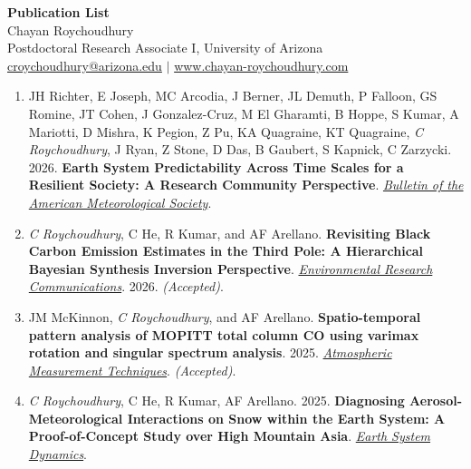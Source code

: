 \documentclass[11pt]{article}
\begin{document}
	
	\begin{center}
		{\Large \textbf{Publication List}} \\[4pt]
		{\large Chayan Roychoudhury} \\[2pt]
		{\small Postdoctoral Research Associate I, University of Arizona} \\
		{\small \href{mailto:croychoudhury@arizona.edu}{croychoudhury@arizona.edu} $\mid$ \href{https://www.chayan-roychoudhury.com/}{www.chayan-roychoudhury.com}}
	\end{center}
	
	\vspace{4mm}
	
	\begin{enumerate}[topsep=2pt, partopsep=1pt, itemsep=4pt, parsep=1pt, leftmargin=18pt, label=\arabic*.]
		
		\item JH Richter, E Joseph, MC Arcodia, J Berner, JL Demuth, P Falloon, GS Romine, JT Cohen, J Gonzalez-Cruz, M El Gharamti, B Hoppe, S Kumar, A Mariotti, D Mishra, K Pegion, Z Pu, KA Quagraine, KT Quagraine, \textit{C Roychoudhury}, J Ryan, Z Stone, D Das, B Gaubert, S Kapnick, C Zarzycki. 2026. \textbf{Earth System Predictability Across Time Scales for a Resilient Society: A Research Community Perspective}. \emph{\href{https://journals.ametsoc.org/view/journals/bams/aop/BAMS-D-24-0155.1/BAMS-D-24-0155.1.xml}{Bulletin of the American Meteorological Society}}.
		
		\item \textit{C Roychoudhury}, C He, R Kumar, and AF Arellano. \textbf{Revisiting Black Carbon Emission Estimates in the Third Pole: A Hierarchical Bayesian Synthesis Inversion Perspective}. \href{https://iopscience.iop.org/article/10.1088/2515-7620/ae4858}{\textit{Environmental Research Communications}}. 2026. \textit{(Accepted)}.
		
		\item JM McKinnon, \textit{C Roychoudhury}, and AF Arellano. \textbf{Spatio-temporal pattern analysis of MOPITT total column CO using varimax rotation and singular spectrum analysis}. 2025. \href{https://doi.org/10.5194/egusphere-2024-3440}{\textit{Atmospheric Measurement Techniques}}. \textit{(Accepted)}.
		
		\item \textit{C Roychoudhury}, C He, R Kumar, AF Arellano. 2025. \textbf{Diagnosing Aerosol-Meteorological Interactions on Snow within the Earth System: A Proof-of-Concept Study over High Mountain Asia}. \emph{\href{https://esd.copernicus.org/articles/16/1237/2025/}{Earth System Dynamics}}.
		

\end{enumerate}
\end{document}
